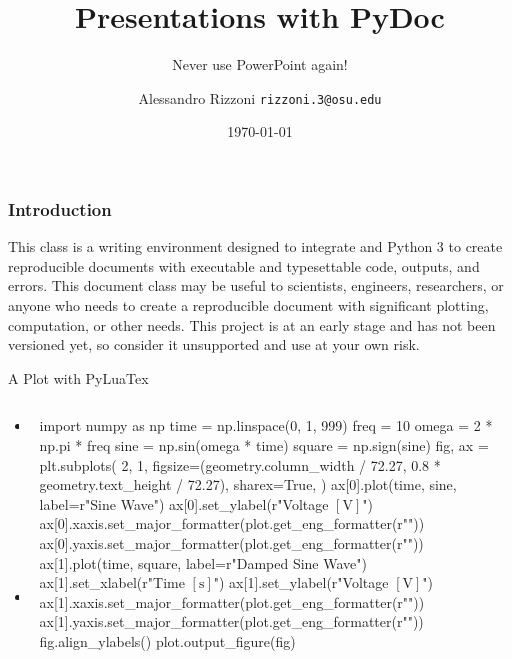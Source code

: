 \documentclass{presentation}
\author{Alessandro Rizzoni \break\texttt{rizzoni.3@osu.edu}}
\title{Presentations with PyDoc}
\subtitle{Never use PowerPoint again!}
\institute{The Ohio State University}
\date{\today}
\begin{document}
  
\begin{frame}
  \titlepage\thispagestyle{empty}
\end{frame}

\begin{frame}

  \frametitle{Introduction}

  This class is a writing environment designed to integrate {\LuaLaTeX} and Python 3 to create reproducible documents with executable and typesettable code, outputs, and errors. This document class may be useful to scientists, engineers, researchers, or anyone who needs to create a reproducible document with significant plotting, computation, or other needs. This project is at an early stage and has not been versioned yet, so consider it unsupported and use at your own risk.

\end{frame}

\begin{frame}[fragile]{A Plot with PyLuaTex}
  \begin{columns}
    \begin{column}{0.25\textwidth}
        \begin{itemize}
        \item Sine Wave
        \item Square Wave
      \end{itemize}
    \end{column}
    \begin{column}{0.75\textwidth}
      \pyloadcontext%
      \begin{pycode}
        import numpy as np
        time = np.linspace(0, 1, 999)
        freq = 10
        omega = 2 * np.pi * freq
        sine = np.sin(omega * time)
        square = np.sign(sine)
        fig, ax = plt.subplots(
            2,
            1,
            figsize=(geometry.column_width / 72.27, 0.8 * geometry.text_height / 72.27),
            sharex=True,
        )
        ax[0].plot(time, sine, label=r"Sine Wave")
        ax[0].set_ylabel(r"Voltage $\left[\unit{\volt}\right]$")
        ax[0].xaxis.set_major_formatter(plot.get_eng_formatter(r"\second"))
        ax[0].yaxis.set_major_formatter(plot.get_eng_formatter(r"\volt"))
        ax[1].plot(time, square, label=r"Damped Sine Wave")
        ax[1].set_xlabel(r"Time $\left[\unit{\second}\right]$")
        ax[1].set_ylabel(r"Voltage $\left[\unit{\volt}\right]$")
        ax[1].xaxis.set_major_formatter(plot.get_eng_formatter(r"\second"))
        ax[1].yaxis.set_major_formatter(plot.get_eng_formatter(r"\volt"))
        fig.align_ylabels()
        plot.output_figure(fig)
      \end{pycode}
    \end{column}
  \end{columns}
\end{frame}
\end{document}
